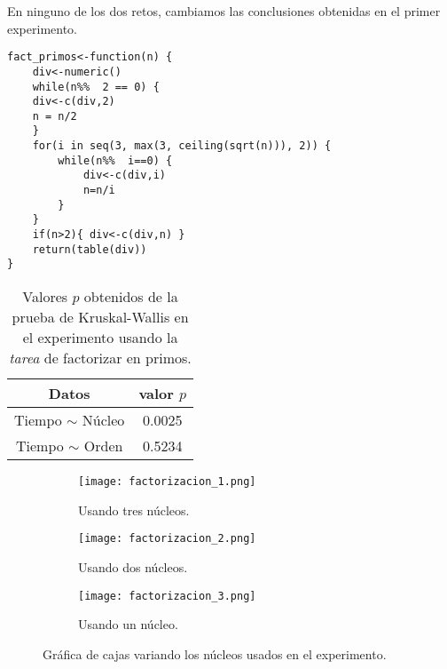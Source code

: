 \documentclass[12pt,letterpaper]{article}
\begin{document}
En ninguno de los dos retos, cambiamos las conclusiones obtenidas en el primer experimento.

\begin{lstlisting}[label=lst:gc3,caption=Función para factorizar en primos un número., frame = single]
fact_primos<-function(n) {
    div<-numeric()
    while(n%%  2 == 0) {
    div<-c(div,2)
    n = n/2
    }
    for(i in seq(3, max(3, ceiling(sqrt(n))), 2)) {
        while(n%%  i==0) {
            div<-c(div,i)
            n=n/i
        }
    }
    if(n>2){ div<-c(div,n) }
    return(table(div))
}
\end{lstlisting} 
\begin{table}
\centering
\caption{Valores $p$ obtenidos de la prueba de Kruskal-Wallis en el experimento usando la \textit{tarea} de factorizar en primos.}
\begin{tabular}{|c|c|}
\hline 
Datos & valor $p$ \\ 
\hline 
Tiempo $\sim$ Núcleo & 0.0025 \\ 
\hline 
Tiempo $\sim$ Orden & 0.5234\\ 
\hline 
\end{tabular} 
\label{datos4}
\end{table} 
 \begin{figure}
 	\centering
 	\begin{subfigure}[b]{0.45\linewidth}
 		\texttt{[image: factorizacion\_1.png]}
 		 \caption{Usando tres núcleos.}
 		\label{factorizacion3}
 	\end{subfigure}
 	\begin{subfigure}[b]{0.45\linewidth}
 		\texttt{[image: factorizacion\_2.png]}
 		 \caption{Usando dos núcleos.}
 		\label{factorizacion2}
 	\end{subfigure}
 	\begin{subfigure}[b]{0.45\linewidth}
 		\texttt{[image: factorizacion\_3.png]}
 		\caption{Usando un núcleo.}
 		\label{factorizacion1}
 	\end{subfigure}
 	\caption{Gráfica de cajas variando los núcleos usados en el experimento.}  		
\label{factorizacion}
 \end{figure}
 

\end{document}
